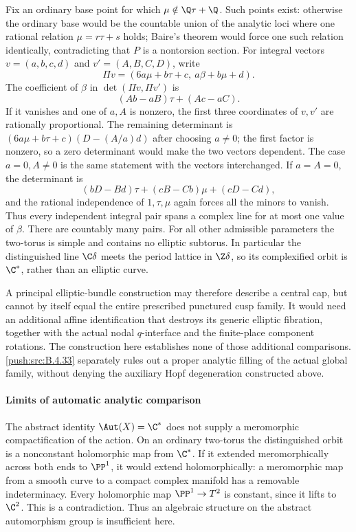 Fix an ordinary base point for which
$\mu\notin\Q\tau+\Q$.  Such points exist: otherwise the
ordinary base would be the countable union of the analytic loci
where one rational relation $\mu=r\tau+s$ holds; Baire's
theorem would force one such relation identically, contradicting
that $P$ is a nontorsion section.  For integral vectors
$v=(a,b,c,d)$ and $v'=(A,B,C,D)$, write
\[
 \Pi v=(6a\mu+b\tau+c,\ a\beta+b\mu+d).
\]
The coefficient of $\beta$ in
$\det(\Pi v,\Pi v')$ is
\[
 (Ab-aB)\tau+(Ac-aC).
\]
If it vanishes and one of $a,A$ is nonzero, the first three
coordinates of $v,v'$ are rationally proportional.  The
remaining determinant is
$(6a\mu+b\tau+c)(D-(A/a)d)$ after choosing $a\ne0$;
the first factor is nonzero, so a zero determinant would make
the two vectors dependent.  The case $a=0,A\ne0$ is the
same statement with the vectors interchanged.  If $a=A=0$,
the determinant is
\[
 (bD-Bd)\tau+(cB-Cb)\mu+(cD-Cd),
\]
and the rational independence of $1,\tau,\mu$ again forces
all the minors to vanish.  Thus every independent integral
pair spans a complex line for at most one value of $\beta$.
There are countably many pairs.  For all other admissible
parameters the two-torus is simple and contains no elliptic
subtorus.  In particular the distinguished line $\C\delta$
meets the period lattice in $\Z\delta$, so its complexified
orbit is $\C^*$, rather than an elliptic curve.

A principal elliptic-bundle construction may therefore describe
a central cap, but cannot by itself equal the entire prescribed
punctured cusp family.  It would need an additional affine
identification that destroys its generic elliptic fibration,
together with the actual nodal $q$-interface and the finite-place
component rotations. The construction here establishes none of
those additional comparisons. \ref{push:src:B.4.33} separately rules out a proper
analytic filling of the actual global family, without denying the
auxiliary Hopf degeneration constructed above.





\paragraph{Limits of automatic analytic comparison}
The abstract identity $\Aut(X)=\C^*$ does not supply a
meromorphic compactification of the action. On an ordinary
two-torus the distinguished orbit is a nonconstant holomorphic
map from $\C^*$. If it extended meromorphically across both
ends to $\PP^1$, it would extend holomorphically: a
meromorphic map from a smooth curve to a compact complex
manifold has a removable indeterminacy. Every holomorphic
map $\PP^1\to T^2$ is constant, since it lifts to $\C^2$.
This is a contradiction. Thus an algebraic structure on the
abstract automorphism group is insufficient here.

